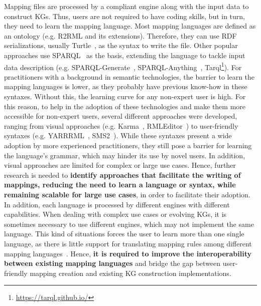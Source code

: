 

Mapping files are processed by a compliant engine along with the input data to construct KGs. 
Thus, users are not required to have coding skills, but in turn, they need to learn the mapping language. 
Most mapping languages are defined as an ontology (e.g. R2RML and its extensions). 
Therefore, they can use RDF serializations, usually Turtle~\parencite{turtle}, as the syntax to write the file.
Other popular approaches use SPARQL~\parencite{harris2013sparql} as the basis, extending the language to tackle input data description (e.g. SPARQL-Generate~\parencite{Lefrancois2017sparqlgenerate}, SPARQL-Anything~\parencite{asprino2023sparql-anything}, Tarql\footnote{\url{https://tarql.github.io/}}). 
For practitioners with a background in semantic technologies, the barrier to learn the mapping languages is lower, as they probably have previous know-how in these syntaxes. 
Without this, the learning curve for any non-expert user is high. 
For this reason, to help in the adoption of these technologies and make them more accessible for non-expert users, several different approaches were developed, ranging from visual approaches (e.g. Karma~\parencite{gupta2012karma}, RMLEditor~\parencite{heyvaert2016rmleditor}) to user-friendly syntaxes (e.g. YARRRML~\parencite{Heyvaert2018yarrrml}, SMS2~\parencite{sms2}). 
While these syntaxes present a wide adoption by more experienced practitioners, they still pose a barrier for learning the language's grammar, which may hinder its use by novel users. 
In addition, visual approaches are limited for complex or large use cases. 
Hence, further research is needed to \textbf{identify approaches that facilitate the writing of mappings, reducing the need to learn a language or syntax, while remaining scalable for large use cases}, in order to facilitate their adoption. 
In addition, each language is processed by different engines with different capabilities. When dealing with complex use cases or evolving KGs, it is sometimes necessary to use different engines, which may not implement the same language. This kind of situations forces the user to learn more than one single language, as there is little support for translating mapping rules among different mapping languages~\parencite{corcho2020towards}. 
Hence, \textbf{it is required to improve the interoperability between existing mapping languages} and bridge the gap between user-friendly mapping creation and existing KG construction implementations. 



